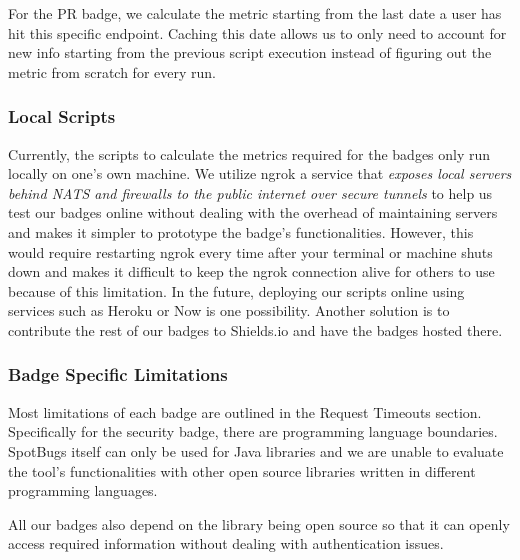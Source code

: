 \documentclass[12pt, letterpaper]{article}
\begin{document}
For the PR badge, we calculate the metric starting from the last date a user has hit this specific endpoint.
Caching this date allows us to only need to account for new info starting from the previous script execution
instead of figuring out the metric from scratch for every run.


\subsubsection{Local Scripts}
Currently, the scripts to calculate the metrics required for the badges only run
locally on one's own machine. We utilize ngrok
\cite{ngrok} a service that \textit{exposes local servers behind NATS and firewalls to the public
internet over secure tunnels} to help us test our badges online without dealing with the overhead of maintaining
servers and makes it simpler to prototype the badge's functionalities. 
However, this would require restarting ngrok every time after your terminal or machine shuts down
and makes it difficult to keep the ngrok connection alive for others to use because of this limitation.
In the future, deploying our scripts online using services such as Heroku \cite{heroku} or Now \cite{nowjs}
is one possibility. Another solution is to contribute the rest of our badges to Shields.io \cite{shieldsrepo}
and have the badges hosted there.

\subsubsection{Badge Specific Limitations}
Most limitations of each badge are outlined in the Request Timeouts section.
Specifically for the security badge, there are programming language boundaries.
SpotBugs \cite{spotbugs} itself can only be used for Java libraries and we are 
unable to evaluate the tool's functionalities with other open source libraries written
in different programming languages.


All our badges also depend on the library being open source so that it can openly
access required information without dealing with authentication issues.
\end{document}
